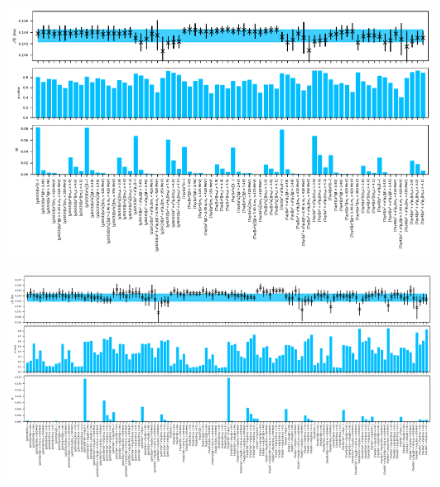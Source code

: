 \begin{figure}
    \centering
    \includegraphics[width=1.\textwidth]{./cap5/figs/BMA_tm.pdf}
    \caption{}
    \label{ch_ss:fig:}
\end{figure}

\begin{figure}
    \centering
    \includegraphics[width=1.\textwidth]{./cap5/figs/BMA_comb.pdf}
    \caption{}
    \label{ch_ss:fig:}
\end{figure}

